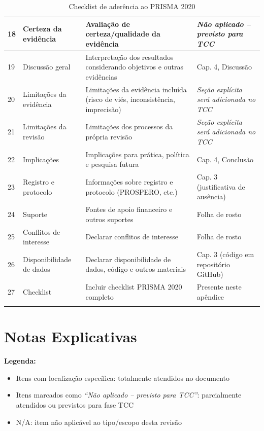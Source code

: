 \begin{apendicesenv}
\begin{longtable}{|p{0.5cm}|p{3.5cm}|p{6cm}|p{3cm}|}
18 & Certeza da evidência & Avaliação de certeza/qualidade da evidência & \textit{Não aplicado -- previsto para TCC} \\
\hline

19 & Discussão geral & Interpretação dos resultados considerando objetivos e outras evidências & Cap. 4, Discussão \\
\hline

20 & Limitações da evidência & Limitações da evidência incluída (risco de viés, inconsistência, imprecisão) & \textit{Seção explícita será adicionada no TCC} \\
\hline

21 & Limitações da revisão & Limitações dos processos da própria revisão & \textit{Seção explícita será adicionada no TCC} \\
\hline

22 & Implicações & Implicações para prática, política e pesquisa futura & Cap. 4, Conclusão \\
\hline

23 & Registro e protocolo & Informações sobre registro e protocolo (PROSPERO, etc.) & Cap. 3 (justificativa de ausência) \\
\hline

24 & Suporte & Fontes de apoio financeiro e outros suportes & Folha de rosto \\
\hline

25 & Conflitos de interesse & Declarar conflitos de interesse & Folha de rosto \\
\hline

26 & Disponibilidade de dados & Declarar disponibilidade de dados, código e outros materiais & Cap. 3 (código em repositório GitHub) \\
\hline

27 & Checklist & Incluir checklist PRISMA 2020 completo & Presente neste apêndice \\
\hline

\caption{Checklist de aderência ao PRISMA 2020 \cite{PRISMA2020}}
\label{tab:prisma-checklist}
\end{longtable}

\section*{Notas Explicativas}

\textbf{Legenda:}
\begin{itemize}
    \item Itens com localização específica: totalmente atendidos no documento
    \item Itens marcados como \textit{``Não aplicado -- previsto para TCC''}: parcialmente atendidos ou previstos para fase TCC
    \item N/A: item não aplicável ao tipo/escopo desta revisão
\end{itemize}


\end{apendicesenv}
